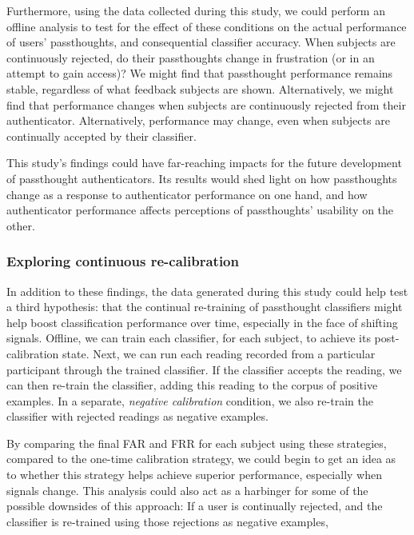 \documentclass[sigconf]{acmart}
\begin{document}
Furthermore, using the data collected during this study, we could perform an offline analysis 
to test for the effect of these conditions on the actual performance of users' passthoughts, and consequential classifier accuracy.
When subjects are continuously rejected, do their passthoughts change in frustration (or in an attempt to gain access)?
We might find that passthought performance 
remains stable, regardless of what feedback subjects are shown.
Alternatively, we might find that performance changes 
when subjects are continuously rejected from their authenticator.
Alternatively, performance may change, 
even when subjects are continually accepted by their classifier.

This study's findings could have far-reaching impacts for the future development of passthought authenticators.
Its results would shed light on how passthoughts change as a response to authenticator performance on one hand,
and how authenticator performance affects perceptions of passthoughts' usability on the other.

\subsubsection{Exploring continuous re-calibration}
\label{sec:org17bc8e1}

In addition to these findings, the data generated during this study could help test 
a third hypothesis: that the continual re-training of passthought classifiers might help boost classification performance over time,
especially in the face of shifting signals.
Offline, we can train each classifier, for each subject, to achieve its post-calibration state.
Next, we can run each reading recorded from a particular participant through the trained classifier.
If the classifier accepts the reading, we can then re-train the classifier, 
adding this reading to the corpus of positive examples.
In a separate, \emph{negative calibration} condition, 
we also re-train the classifier with rejected readings as negative examples.

By comparing the final FAR and FRR for each subject using these strategies, 
compared to the one-time calibration strategy, we could begin to get an idea as to whether
this strategy helps achieve superior performance, especially when signals change.
This analysis could also act as a harbinger for some of the possible downsides of this approach:
If a user is continually rejected, and the classifier is re-trained using those rejections as negative examples,
\end{document}
